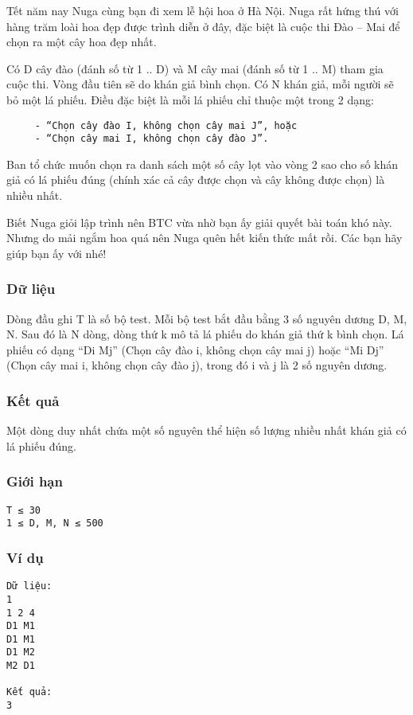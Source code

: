 



   Tết năm nay Nuga cùng bạn đi xem lễ hội hoa ở Hà Nội. Nuga rất hứng thú với hàng trăm loài hoa đẹp được trình diễn ở đây, đặc biệt là cuộc thi Đào – Mai để chọn ra một cây hoa đẹp nhất.  

   Có D cây đào (đánh số từ 1 .. D) và M cây mai (đánh số từ 1 .. M) tham gia cuộc thi. Vòng đầu tiên sẽ do khán giả bình chọn. Có N khán giả, mỗi người sẽ bỏ một lá phiếu. Điều đặc biệt là mỗi lá phiếu chỉ thuộc một trong 2 dạng:  
\begin{verbatim}
     - “Chọn cây đào I, không chọn cây mai J”, hoặc
     - “Chọn cây mai I, không chọn cây đào J”.
\end{verbatim}



   Ban tổ chức muốn chọn ra danh sách một số cây lọt vào vòng 2 sao cho số khán giả có lá phiếu đúng (chính xác cả cây được chọn và cây không được chọn) là nhiều nhất.  

   Biết Nuga giỏi lập trình nên BTC vừa nhờ bạn ấy giải quyết bài toán khó này. Nhưng do mải ngắm hoa quá nên Nuga quên hết kiến thức mất rồi. Các bạn hãy giúp bạn ấy với nhé!  

\subsubsection{   Dữ liệu  }

   Dòng đầu ghi T là số bộ test. Mỗi bộ test bắt đầu bằng 3 số nguyên dương D, M, N. Sau đó là N dòng, dòng thứ k mô tả lá phiếu do khán giả thứ k bình chọn. Lá phiếu có dạng “Di Mj” (Chọn cây đào i, không chọn cây mai j) hoặc “Mi Dj” (Chọn cây mai i, không chọn cây đào j), trong đó i và j là 2 số nguyên dương.  

\subsubsection{   Kết quả  }

   Một dòng duy nhất chứa một số nguyên thể hiện số lượng nhiều nhất khán giả có lá phiếu đúng.  

\subsubsection{   Giới hạn  }
\begin{verbatim}
T ≤ 30
1 ≤ D, M, N ≤ 500
\end{verbatim}

\subsubsection{   Ví dụ  }
\begin{verbatim}
Dữ liệu:
1
1 2 4
D1 M1
D1 M1
D1 M2
M2 D1

Kết quả:
3

\end{verbatim}